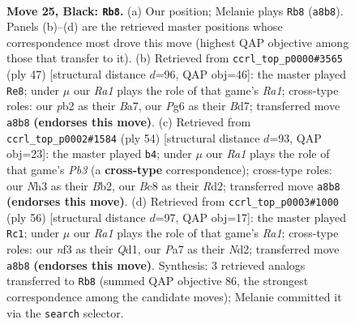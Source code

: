 \documentclass[11pt]{article}
\begin{document}
\clearpage

\begin{figure}[p]\centering
\begin{subfigure}{0.46\textwidth}\centering
\resizebox{\linewidth}{!}{%
\newchessgame
\chessboard[
  setfen={r1b1q2k/ppb4p/5ppB/3B4/7P/3P1NPn/PPPQ1PK1/R7 b - - 2 25},
  showmover=false,
  pgfstyle=straightmove, color=movearrow, markmove={a8-b8}
]}
\caption{}
\end{subfigure}\hfill
\begin{subfigure}{0.46\textwidth}\centering
\resizebox{\linewidth}{!}{%
\newchessgame
\chessboard[
  setfen={r5k1/bp1b1pp1/7p/q2p4/p2Nn3/2PBB2P/PP3PP1/2Q1R1K1 b - - 9 24},
  showmover=false,
  pgfstyle=straightmove, color=movearrow, markmove={a8-e8}
]}
\caption{}
\end{subfigure}
\\[4pt]
\begin{subfigure}{0.46\textwidth}\centering
\resizebox{\linewidth}{!}{%
\newchessgame
\chessboard[
  setfen={b2rn1k1/p1q1bpp1/1p2p2p/7N/8/PP1BP2P/1B1R1PP1/3Q2K1 w - - 15 28},
  showmover=false,
  pgfstyle=straightmove, color=movearrow, markmove={b3-b4}
]}
\caption{}
\end{subfigure}\hfill
\begin{subfigure}{0.46\textwidth}\centering
\resizebox{\linewidth}{!}{%
\newchessgame
\chessboard[
  setfen={8/1pqb2bk/2np2pp/p7/P2p4/2P4P/1PBN1KP1/R2Q4 w - - 0 29},
  showmover=false,
  pgfstyle=straightmove, color=movearrow, markmove={a1-c1}
]}
\caption{}
\end{subfigure}
\caption{\textbf{Move 25, Black: \texttt{Rb8}.} (a) Our position; Melanie plays \texttt{Rb8} (\texttt{a8b8}). Panels (b)--(d) are the retrieved master positions whose correspondence most drove this move (highest QAP objective among those that transfer to it). (b) Retrieved from \texttt{ccrl\_top\_p0000\#3565} (ply 47) [structural distance $d$=96, QAP obj=46]: the master played \texttt{Re8}; under $\mu$ our \emph{Ra1} plays the role of that game's \emph{Ra1}; cross-type roles: our \emph{p}b2 as their \emph{B}a7, our \emph{P}g6 as their \emph{B}d7; transferred move \texttt{a8b8} \textbf{(endorses this move)}. (c) Retrieved from \texttt{ccrl\_top\_p0002\#1584} (ply 54) [structural distance $d$=93, QAP obj=23]: the master played \texttt{b4}; under $\mu$ our \emph{Ra1} plays the role of that game's \emph{Pb3} (a \textbf{cross-type} correspondence); cross-type roles: our \emph{N}h3 as their \emph{B}b2, our \emph{B}c8 as their \emph{R}d2; transferred move \texttt{a8b8} \textbf{(endorses this move)}. (d) Retrieved from \texttt{ccrl\_top\_p0003\#1000} (ply 56) [structural distance $d$=97, QAP obj=17]: the master played \texttt{Rc1}; under $\mu$ our \emph{Ra1} plays the role of that game's \emph{Ra1}; cross-type roles: our \emph{n}f3 as their \emph{Q}d1, our \emph{P}a7 as their \emph{N}d2; transferred move \texttt{a8b8} \textbf{(endorses this move)}. Synthesis: 3 retrieved analogs transferred to \texttt{Rb8} (summed QAP objective 86, the strongest correspondence among the candidate moves); Melanie committed it via the \texttt{search} selector.}
\label{fig:thought-m49}
\end{figure}
\end{document}
